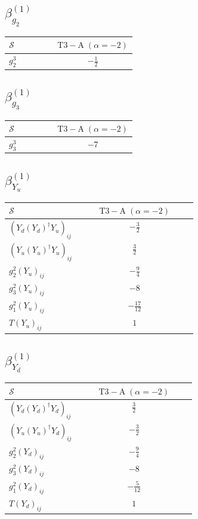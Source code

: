 \documentclass[9pt]{article}
\begin{document}
\subsection*{$ \beta_{g_2}^{(1)} $}
\begin{longtable}{@{}p{0.38\linewidth}c@{}}
\toprule
$\mathcal{S}$ & $ \mathrm{T3-A}\;(\alpha=-2) $ \\
\midrule
$ g_2^3 $ & $ - \frac{1}{2} $ \\
\bottomrule
\end{longtable}
\subsection*{$ \beta_{g_3}^{(1)} $}
\begin{longtable}{@{}p{0.38\linewidth}c@{}}
\toprule
$\mathcal{S}$ & $ \mathrm{T3-A}\;(\alpha=-2) $ \\
\midrule
$ g_3^3 $ & $ -7 $ \\
\bottomrule
\end{longtable}
\subsection*{$ \beta_{Y_u}^{(1)} $}
\begin{longtable}{@{}p{0.38\linewidth}c@{}}
\toprule
$\mathcal{S}$ & $ \mathrm{T3-A}\;(\alpha=-2) $ \\
\midrule
$ (Y_d (Y_d)^{\dagger} Y_u)_{ij} $ & $ - \frac{3}{2} $ \\
$ (Y_u (Y_u)^{\dagger} Y_u)_{ij} $ & $ \frac{3}{2} $ \\
$ g_2^2 (Y_u)_{ij} $ & $ - \frac{9}{4} $ \\
$ g_3^2 (Y_u)_{ij} $ & $ -8 $ \\
$ g_1^2 (Y_u)_{ij} $ & $ - \frac{17}{12} $ \\
$ T (Y_u)_{ij} $ & $ 1 $ \\
\bottomrule
\end{longtable}
\subsection*{$ \beta_{Y_d}^{(1)} $}
\begin{longtable}{@{}p{0.38\linewidth}c@{}}
\toprule
$\mathcal{S}$ & $ \mathrm{T3-A}\;(\alpha=-2) $ \\
\midrule
$ (Y_d (Y_d)^{\dagger} Y_d)_{ij} $ & $ \frac{3}{2} $ \\
$ (Y_u (Y_u)^{\dagger} Y_d)_{ij} $ & $ - \frac{3}{2} $ \\
$ g_2^2 (Y_d)_{ij} $ & $ - \frac{9}{4} $ \\
$ g_3^2 (Y_d)_{ij} $ & $ -8 $ \\
$ g_1^2 (Y_d)_{ij} $ & $ - \frac{5}{12} $ \\
$ T (Y_d)_{ij} $ & $ 1 $ \\
\bottomrule
\end{longtable}
\end{document}
